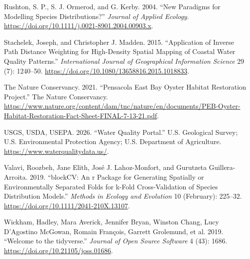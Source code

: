 \documentclass[
  letterpaper,
  DIV=11,
  numbers=noendperiod]{scrartcl}
\newlength{\cslhangindent}
\newenvironment{CSLReferences}[2] %
 {\begin{list}{}{%
  \setlength{\itemindent}{0pt}
  \setlength{\leftmargin}{0pt}
  \setlength{\parsep}{0pt}
  \ifodd #1
   \setlength{\leftmargin}{\cslhangindent}
   \setlength{\itemindent}{-1\cslhangindent}
  \fi
  \setlength{\itemsep}{#2\baselineskip}}}
 {\end{list}}
\begin{document}
\begin{CSLReferences}{1}{0}
Rushton, S. P., S. J. Ormerod, and G. Kerby. 2004. {``New Paradigms for
Modelling Species Distributions?''} \emph{Journal of Applied Ecology}.
\url{https://doi.org/10.1111/j.0021-8901.2004.00903.x}.

Stachelek, Joseph, and Christopher J. Madden. 2015. {``Application of
Inverse Path Distance Weighting for High-Density Spatial Mapping of
Coastal Water Quality Patterns.''} \emph{International Journal of
Geographical Information Science} 29 (7): 1240--50.
\url{https://doi.org/10.1080/13658816.2015.1018833}.

The Nature Conservancy. 2021. {``Pensacola East Bay Oyster Habitat
Restoration Project.''} The Nature Conservancy.
\url{https://www.nature.org/content/dam/tnc/nature/en/documents/PEB-Oyster-Habitat-Restoration-Fact-Sheet-FINAL-7-13-21.pdf}.

USGS, USDA, USEPA. 2026. {``Water Quality Portal.''} {U.S. Geological
Survey}; {U.S. Environmental Protection Agency}; {U.S. Department of
Agriculture}. \url{https://www.waterqualitydata.us/}.

Valavi, Roozbeh, Jane Elith, José J. Lahoz-Monfort, and Gurutzeta
Guillera-Arroita. 2019. {``blockCV: An r Package for Generating
Spatially or Environmentally Separated Folds for k-Fold Cross-Validation
of Species Distribution Models.''} \emph{Methods in Ecology and
Evolution} 10 (February): 225--32.
\url{https://doi.org/10.1111/2041-210X.13107}.

Wickham, Hadley, Mara Averick, Jennifer Bryan, Winston Chang, Lucy
D'Agostino McGowan, Romain François, Garrett Grolemund, et al. 2019.
{``Welcome to the {tidyverse}.''} \emph{Journal of Open Source Software}
4 (43): 1686. \url{https://doi.org/10.21105/joss.01686}.

\end{CSLReferences}
\end{document}
